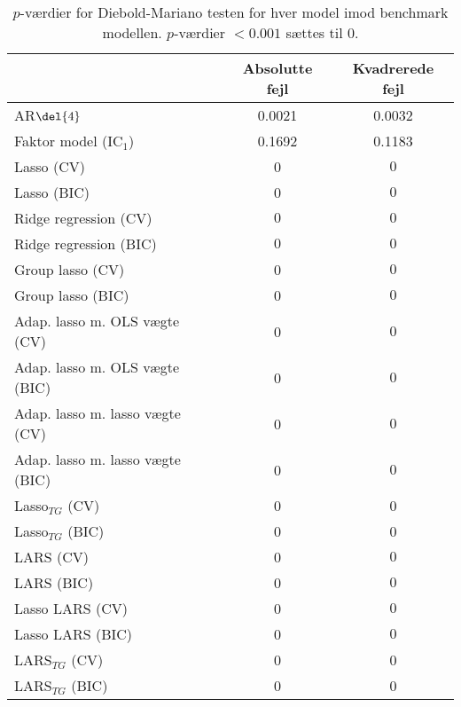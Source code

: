 \begin{table}[ht]
\center
\begin{tabular}{lcc}
\toprule
 & Absolutte fejl & Kvadrerede fejl \\ \midrule
AR\(\del{4}\) & 0.0021 & 0.0032 \\  
Faktor model (IC\(_1\)) & 0.1692 & 0.1183 \\
Lasso (CV) & 0 & $0$ \\
Lasso (BIC) & 0 & $0$ \\
Ridge regression (CV) & $0$  & $0$  \\
Ridge regression (BIC) &$0 $& $0$\\
Group lasso (CV) & 0 &$ 0$  \\
Group lasso (BIC) & 0& $0$ \\
Adap. lasso m. OLS vægte (CV) & 0& $0 $\\
Adap. lasso m. OLS vægte (BIC) & 0& $0$\\
Adap. lasso m. lasso vægte (CV) & 0 & $0 $\\
Adap. lasso m. lasso vægte (BIC) & 0& $0$\\
Lasso$_{TG}$ (CV)&  0 & 0 \\
Lasso$_{TG}$ (BIC) & 0 & 0 \\
LARS (CV) & 0 & $0$  \\
LARS (BIC) & 0& $0$ \\
Lasso LARS (CV) & 0& $0$ \\
Lasso LARS (BIC) & 0& $0$ \\ 
LARS$_{TG}$ (CV) & 0 & 0 \\
LARS$_{TG}$ (BIC) &0 & 0\\ \bottomrule
\end{tabular}
\caption{\(p\)-værdier for Diebold-Mariano testen for hver model imod benchmark modellen.
\(p\)-værdier \(< 0.001\) sættes til 0.} \label{tab:dm_test}
\end{table}
